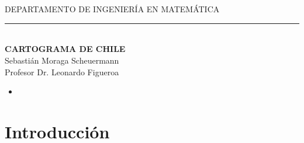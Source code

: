 \documentclass[20pt]{report}
\begin{document}
\begin{center}
\\
\\

{DEPARTAMENTO DE INGENIER\'IA EN MATEM\'ATICA}
\end{center}
\begin{center}
\noindent\rule{15cm}{.5pt}\\
\vspace{2cm}
\textbf{\Large{ CARTOGRAMA	 DE CHILE}}\\

\Large{Sebasti\'an Moraga Scheuermann}\\

\Large{Profesor Dr. Leonardo Figueroa}\\

\end{center}



 \vspace{.2cm}
  \noindent
\begin{itemize}
\item [\bf ]{\bf    }
\topmargin=-1.6cm


\end{itemize}
\topmargin=-1.6cm
\vspace{3cm}
\noindent 






\pagebreak


 \tableofcontents %


\chapter{Introducci\'on}\label{cap.introduccion}
\end{document}
